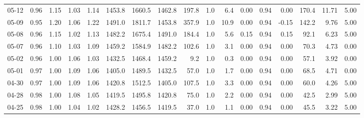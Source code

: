 \begin{threeparttable}
{\begin{tabular}{lrrrrrrrrrrrrrrrr}
  05-12 &         0.96 &           1.15 &          1.03 &          1.14 & 1453.8 & 1660.5 & 1462.8 &      197.8 &                      1.0 &                 6.4 &       0.00 &      0.94 &           0.00 &            170.4 &           11.71 &                   5.00 \\
  05-09 &         0.95 &           1.20 &          1.06 &          1.22 & 1491.0 & 1811.7 & 1453.8 &      357.9 &                      1.0 &                10.9 &       0.00 &      0.94 &          -0.15 &            142.2 &            9.76 &                   5.00 \\
  05-08 &         0.96 &           1.15 &          1.02 &          1.13 & 1482.2 & 1675.4 & 1491.0 &      184.4 &                      1.0 &                 5.6 &       0.15 &      0.94 &           0.15 &             92.1 &            6.23 &                   5.00 \\
  05-07 &         0.96 &           1.10 &          1.03 &          1.09 & 1459.2 & 1584.9 & 1482.2 &      102.6 &                      1.0 &                 3.1 &       0.00 &      0.94 &           0.00 &             70.3 &            4.73 &                   0.00 \\
  05-02 &         0.96 &           1.00 &          1.06 &          1.03 & 1432.5 & 1468.4 & 1459.2 &        9.2 &                      1.0 &                 0.3 &       0.00 &      0.94 &           0.00 &             57.1 &            3.92 &                   0.00 \\
  05-01 &         0.97 &           1.00 &          1.09 &          1.06 & 1405.0 & 1489.5 & 1432.5 &       57.0 &                      1.0 &                 1.7 &       0.00 &      0.94 &           0.00 &             68.5 &            4.71 &                   0.00 \\
  04-30 &         0.97 &           1.00 &          1.09 &          1.06 & 1420.8 & 1512.5 & 1405.0 &      107.5 &                      1.0 &                 3.3 &       0.00 &      0.94 &           0.00 &             60.0 &            4.26 &                   5.00 \\
  04-28 &         0.98 &           1.00 &          1.08 &          1.05 & 1419.5 & 1495.8 & 1420.8 &       75.0 &                      1.0 &                 2.2 &       0.00 &      0.94 &           0.00 &             42.5 &            2.99 &                   5.00 \\
  04-25 &         0.98 &           1.00 &          1.04 &          1.02 & 1428.2 & 1456.5 & 1419.5 &       37.0 &                      1.0 &                 1.1 &       0.00 &      0.94 &           0.00 &             45.5 &            3.22 &                   5.00 \\

\end{tabular}}
\end{threeparttable}
